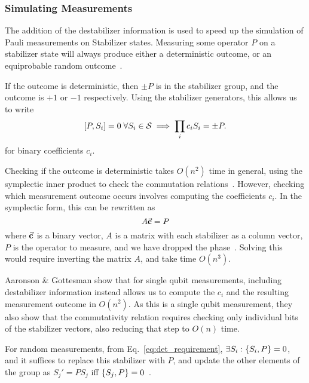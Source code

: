 \subsubsection{Simulating Measurements}
The addition of the destabilizer information is  used to speed up the simulation of Pauli measurements on Stabilizer states. Measuring some operator $P$ on a stabilizer state will always produce either a deterministic outcome, or an equiprobable random outcome~\cite{Gottesman1998b}.\par
If the outcome is deterministic, then $\pm P$ is in the stabilizer group, and the outcome is $+1$ or $-1$ respectively. Using the stabilizer generators, this allows us to write 
\begin{equation}
    \comm{P}{S_{i}}=0\;\forall S_{i}\in\mathcal{S} \implies \prod_{i}c_{i}S_{i} = \pm P. \label{eq:det_requirement}
\end{equation}
for binary coefficients $c_{i}$.\par
Checking if the outcome is deterministic takes $O(n^{2})$ time in general, using the symplectic inner product to check the commutation relations~\cite{Dehaene2003}. However, checking which measurement outcome occurs involves computing the coefficients $c_{i}$. In the symplectic form, this can be rewritten as
\[
    A\va{c}=P
\]
where $\va{c}$ is a binary vector, $A$ is a matrix with each stabilizer as a column vector, $P$ is the operator to measure, and we have dropped the phase~\cite{Aaronson2004}. Solving this would require inverting the matrix $A$, and take time $O(n^{3})$.\par
Aaronson \& Gottesman show that for single qubit measurements, including destabilizer information instead allows us to compute the $c_{i}$ and the resulting measurement outcome in $O(n^{2})$. As this is a single qubit measurement, they also show that the commutativity relation requires checking only individual bits of the stabilizer vectors, also reducing that step to $O(n)$ time.\par
For random measurements, from Eq.~\ref{eq:det_requirement}, $\exists S_{i}:\acomm{S_{i}}{P}=0$, and it suffices to replace this stabilizer with $P$, and update the other elements of the group as $S_{j}'=PS_{j}$ iff $\acomm{S_{j}}{P}=0$~\cite{Gottesman1998b,Aaronson2004}.
